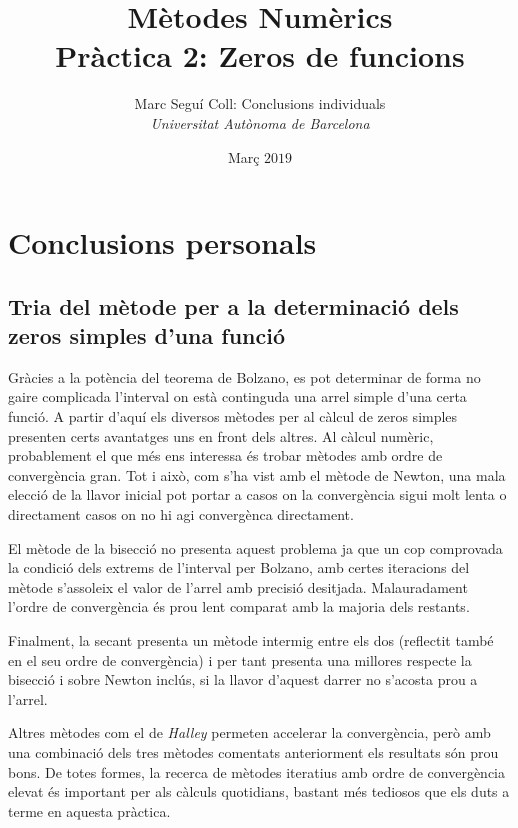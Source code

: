 \documentclass[a4paper,10.4pt]{article}
\begin{document}
 
\title{\Large\bfseries\sffamily Mètodes Numèrics\\Pràctica 2: \Large\sffamily Zeros de funcions}
\author{\sffamily Marc Seguí Coll: Conclusions individuals\\\normalsize\emph{Universitat Autònoma de Barcelona}}
\date{\normalsize Març \emph{$2019$}}


\maketitle

\section{Conclusions personals}
\subsection{Tria del mètode per a la determinació dels zeros simples d'una funció}

Gràcies a la potència del teorema de Bolzano, es pot determinar de forma no gaire complicada l'interval on està continguda una arrel simple d'una certa funció. A partir d'aquí els diversos mètodes per al càlcul de zeros simples presenten certs avantatges uns en front dels altres. Al càlcul numèric, probablement el que més ens interessa és trobar mètodes amb ordre de convergència gran. Tot i això, com s'ha vist amb el mètode de Newton, una mala elecció de la llavor inicial pot portar a casos on la convergència sigui molt lenta o directament casos on no hi agi convergènca directament.

El mètode de la bisecció no presenta aquest problema ja que un cop comprovada la condició dels extrems de l'interval per Bolzano, amb certes iteracions del mètode s'assoleix el valor de l'arrel amb precisió desitjada. Malauradament l'ordre de convergència és prou lent comparat amb la majoria dels restants. 

Finalment, la secant presenta un mètode intermig entre els dos (reflectit també en el seu ordre de convergència) i per tant presenta una millores respecte la bisecció i sobre Newton inclús, si la llavor d'aquest darrer no s'acosta prou a l'arrel.

Altres mètodes com el de \emph{Halley} permeten accelerar la convergència, però amb una combinació dels tres mètodes comentats anteriorment els resultats són prou bons. De totes formes, la recerca de mètodes iteratius amb ordre de convergència elevat és important per als càlculs quotidians, bastant més tediosos que els duts a terme en aquesta pràctica.
\end{document}
